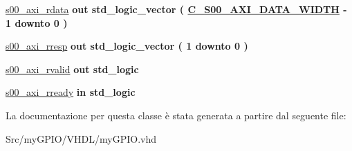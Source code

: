 \begin{DoxyCompactItemize}
\item 
\hypertarget{classmy_g_p_i_o_gad2655fadb987e0487c428aca187b55d0}{\hyperlink{group___a_x_i-device_gad2655fadb987e0487c428aca187b55d0}{s00\+\_\+axi\+\_\+rdata}  {\bfseries {\bfseries \textcolor{vhdlchar}{out}\textcolor{vhdlchar}{ }}} {\bfseries \textcolor{vhdlchar}{std\+\_\+logic\+\_\+vector}\textcolor{vhdlchar}{ }\textcolor{vhdlchar}{(}\textcolor{vhdlchar}{ }\textcolor{vhdlchar}{ }\textcolor{vhdlchar}{ }\textcolor{vhdlchar}{ }{\bfseries \hyperlink{group___a_x_i-device_gafce7943994a4ddfa81f224225976a4c7}{C\+\_\+\+S00\+\_\+\+A\+X\+I\+\_\+\+D\+A\+T\+A\+\_\+\+W\+I\+D\+T\+H}} \textcolor{vhdlchar}{-\/}\textcolor{vhdlchar}{ } \textcolor{vhdldigit}{1} \textcolor{vhdlchar}{ }\textcolor{vhdlchar}{downto}\textcolor{vhdlchar}{ }\textcolor{vhdlchar}{ } \textcolor{vhdldigit}{0} \textcolor{vhdlchar}{ }\textcolor{vhdlchar}{)}\textcolor{vhdlchar}{ }} }\label{classmy_g_p_i_o_gad2655fadb987e0487c428aca187b55d0}

\item 
\hypertarget{classmy_g_p_i_o_ga1acee955f50f71e5595a03c6ca301cf0}{\hyperlink{group___a_x_i-device_ga1acee955f50f71e5595a03c6ca301cf0}{s00\+\_\+axi\+\_\+rresp}  {\bfseries {\bfseries \textcolor{vhdlchar}{out}\textcolor{vhdlchar}{ }}} {\bfseries \textcolor{vhdlchar}{std\+\_\+logic\+\_\+vector}\textcolor{vhdlchar}{ }\textcolor{vhdlchar}{(}\textcolor{vhdlchar}{ }\textcolor{vhdlchar}{ } \textcolor{vhdldigit}{1} \textcolor{vhdlchar}{ }\textcolor{vhdlchar}{downto}\textcolor{vhdlchar}{ }\textcolor{vhdlchar}{ } \textcolor{vhdldigit}{0} \textcolor{vhdlchar}{ }\textcolor{vhdlchar}{)}\textcolor{vhdlchar}{ }} }\label{classmy_g_p_i_o_ga1acee955f50f71e5595a03c6ca301cf0}

\item 
\hypertarget{classmy_g_p_i_o_gaf180911f7eb262e530e26865bc97aa0b}{\hyperlink{group___a_x_i-device_gaf180911f7eb262e530e26865bc97aa0b}{s00\+\_\+axi\+\_\+rvalid}  {\bfseries {\bfseries \textcolor{vhdlchar}{out}\textcolor{vhdlchar}{ }}} {\bfseries \textcolor{vhdlchar}{std\+\_\+logic}\textcolor{vhdlchar}{ }} }\label{classmy_g_p_i_o_gaf180911f7eb262e530e26865bc97aa0b}

\item 
\hypertarget{classmy_g_p_i_o_ga8b82eb165d7024f6c7b25646f6ebdd4d}{\hyperlink{group___a_x_i-device_ga8b82eb165d7024f6c7b25646f6ebdd4d}{s00\+\_\+axi\+\_\+rready}  {\bfseries {\bfseries \textcolor{vhdlchar}{in}\textcolor{vhdlchar}{ }}} {\bfseries \textcolor{vhdlchar}{std\+\_\+logic}\textcolor{vhdlchar}{ }} }\label{classmy_g_p_i_o_ga8b82eb165d7024f6c7b25646f6ebdd4d}

\begin{DoxyCompactList}\small\item\em \end{DoxyCompactList}\end{DoxyCompactItemize}


La documentazione per questa classe è stata generata a partire dal seguente file\+:\begin{DoxyCompactItemize}
\item 
Src/my\+G\+P\+I\+O/\+V\+H\+D\+L/my\+G\+P\+I\+O.\+vhd\end{DoxyCompactItemize}
